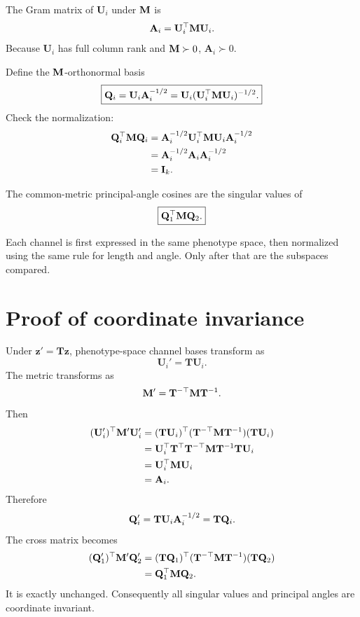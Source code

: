 The Gram matrix of \(\mathbf U_i\) under \(\mathbf{M}\) is
\begin{equation}
\mathbf A_i=\mathbf U_i^\top\mathbf{M}\mathbf U_i.
\end{equation}
Because \(\mathbf U_i\) has full column rank and \(\mathbf{M}\succ0\), \(\mathbf A_i\succ0\).

Define the \(\mathbf{M}\)-orthonormal basis
\begin{equation}
\boxed{
\mathbf{Q}_i=\mathbf U_i\mathbf A_i^{-1/2}
=\mathbf U_i(\mathbf U_i^\top\mathbf{M}\mathbf U_i)^{-1/2}.}
\label{eq:MOrthonormalBasis}
\end{equation}
Check the normalization:
\begin{align}
\mathbf{Q}_i^\top\mathbf{M}\mathbf{Q}_i
&=\mathbf A_i^{-1/2}\mathbf U_i^\top\mathbf{M}\mathbf U_i\mathbf A_i^{-1/2}\\
&=\mathbf A_i^{-1/2}\mathbf A_i\mathbf A_i^{-1/2}\\
&=\mathbf{I}_k.
\end{align}

The common-metric principal-angle cosines are the singular values of
\begin{equation}
\boxed{\mathbf{Q}_1^\top\mathbf{M}\mathbf{Q}_2.}
\label{eq:commonMetricCrossMatrix}
\end{equation}

\inwords Each channel is first expressed in the same phenotype space, then normalized using the same rule for length and angle. Only after that are the subspaces compared.

\section{Proof of coordinate invariance}

Under \(\mathbf z'=\mathbf T\mathbf z\), phenotype-space channel bases transform as
\begin{equation}
\mathbf U_i'=\mathbf T\mathbf U_i.
\end{equation}
The metric transforms as
\begin{equation}
\mathbf{M}'=\mathbf T^{-\top}\mathbf{M}\mathbf T^{-1}.
\end{equation}
Then
\begin{align}
(\mathbf U_i')^\top\mathbf{M}'\mathbf U_i'
&=(\mathbf T\mathbf U_i)^\top
(\mathbf T^{-\top}\mathbf{M}\mathbf T^{-1})
(\mathbf T\mathbf U_i)\\
&=\mathbf U_i^\top\mathbf T^\top\mathbf T^{-\top}
\mathbf{M}
\mathbf T^{-1}\mathbf T\mathbf U_i\\
&=\mathbf U_i^\top\mathbf{M}\mathbf U_i\\
&=\mathbf A_i.
\end{align}
Therefore
\begin{equation}
\mathbf{Q}_i'=\mathbf T\mathbf U_i\mathbf A_i^{-1/2}
=\mathbf T\mathbf{Q}_i.
\end{equation}
The cross matrix becomes
\begin{align}
(\mathbf{Q}_1')^\top\mathbf{M}'\mathbf{Q}_2'
&=(\mathbf T\mathbf{Q}_1)^\top
(\mathbf T^{-\top}\mathbf{M}\mathbf T^{-1})
(\mathbf T\mathbf{Q}_2)\\
&=\mathbf{Q}_1^\top\mathbf{M}\mathbf{Q}_2.
\end{align}
It is exactly unchanged. Consequently all singular values and principal angles are coordinate invariant.

